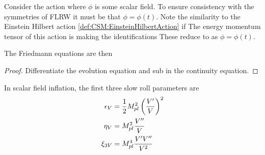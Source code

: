 \documentclass{article}
\begin{document}
Consider the action
where $\phi$ is some scalar field. To ensure consistency with the symmetries of FLRW it must be that $\phi = \phi(t)$.  Note the similarity to the Einstein Hilbert action \ref{def:CSM:EinsteinHilbertAction} if 
The energy momentum tensor of this action is 
making the identifications 
These reduce to 
as $\phi=\phi(t)$. 

The Friedmann equations are then 

\begin{prop}\label{prop:CSM:1}
\end{prop}
\begin{proof}
Differentiate the evolution equation and sub in the continuity equation. 
\end{proof}

\begin{definition}
In scalar field inflation, the first three slow roll parameters are 
\begin{align}\label{eq:CSM:13}
\epsilon_V &= \frac{1}{2} M_{pl}^2 \left( \frac{V^\prime}{V} \right)^2 \\
\eta_V &= M_{pl}^2 \frac{V^{\prime\prime}}{V} \\
\xi_{3V} &= M_{pl}^4 \frac{V^\prime V^{\prime\prime}}{V^2}
\end{align}
\end{definition}
\end{document}
